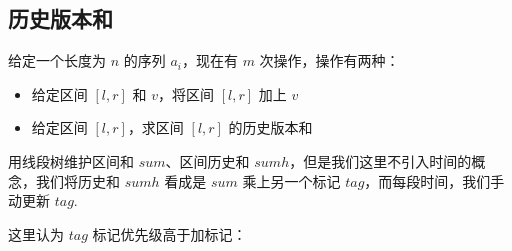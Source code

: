 \subsection{历史版本和}
\par \noindent 给定一个长度为 $n$ 的序列 $a_i$，现在有 $m$ 次操作，操作有两种：
\begin{tcolorbox}
\begin{itemize}
\item 给定区间 $[l,r]$ 和 $v$，将区间 $[l,r]$ 加上 $v$
\item 给定区间 $[l,r]$，求区间 $[l,r]$ 的历史版本和
\end{itemize}
\end{tcolorbox}
\par \noindent 用线段树维护区间和 $sum$、区间历史和 $sumh$，但是我们这里不引入时间的概念，我们将历史和 $sumh$ 看成是 $sum$ 乘上另一个标记 $tag$，而每段时间，我们手动更新 $tag$.
\par \noindent 这里认为 $tag$ 标记优先级高于加标记：
